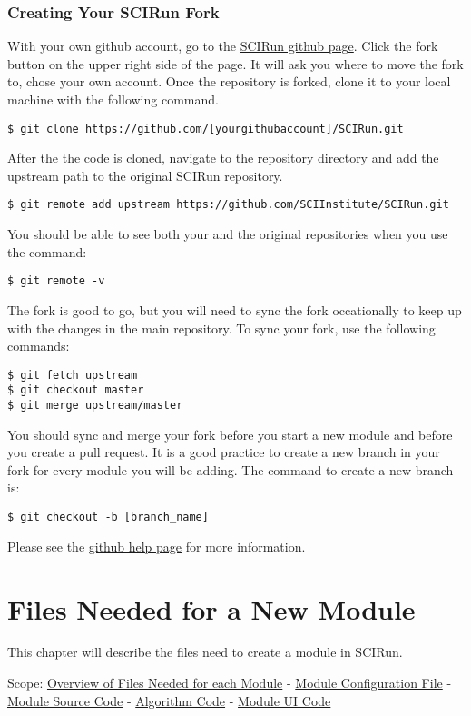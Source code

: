 \documentclass[fleqn,11pt,openany]{book}
\begin{document}
\subsection{Creating Your SCIRun Fork}
\label{sec:forking}

With your own github account, go to the \href{https://github.com/SCIInstitute/SCIRun}{SCIRun github page}.
Click the fork button on the upper right side of the page.  
It will ask you where to move the fork to, chose your own account.  
Once the repository is forked, clone it to your local machine with the following command.  
\begin{verbatim}
$ git clone https://github.com/[yourgithubaccount]/SCIRun.git
\end{verbatim}
After the the code is cloned, navigate to the repository directory and add the upstream path to the original SCIRun repository.
\begin{verbatim}
$ git remote add upstream https://github.com/SCIInstitute/SCIRun.git
\end{verbatim}
You should be able to see both your and the original repositories when you use the command:
\begin{verbatim}
$ git remote -v
\end{verbatim}
The fork is good to go, but you will need to sync the fork occationally to keep up with the changes in the main repository.  To sync your fork, use the following commands:
\begin{verbatim}
$ git fetch upstream
$ git checkout master
$ git merge upstream/master
\end{verbatim}
You should sync and merge your fork before you start a new module and before you create a pull request.  
It is a good practice to create a new branch in your fork for every module you will be adding.  The command to create a new branch is:
\begin{verbatim}
$ git checkout -b [branch_name]
\end{verbatim}
Please see the \href{https://help.github.com}{github help page} for more information.

\chapter{Files Needed for a New Module}
\label{sec:files}

\begin{introduction}
This chapter will describe the files need to create a module in SCIRun.

Scope: \hyperref[sec:overview]{Overview of Files Needed for each Module} - \hyperref[sec:config]{Module Configuration File} -
\hyperref[sec:module]{Module Source Code} - \hyperref[sec:algo]{Algorithm Code} - \hyperref[sec:ui]{Module UI Code}
\end{introduction}
\end{document}
